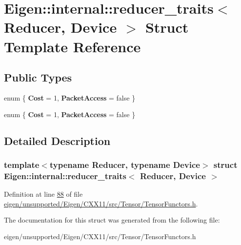 \hypertarget{struct_eigen_1_1internal_1_1reducer__traits}{}\section{Eigen\+:\+:internal\+:\+:reducer\+\_\+traits$<$ Reducer, Device $>$ Struct Template Reference}
\label{struct_eigen_1_1internal_1_1reducer__traits}
\subsection*{Public Types}
\begin{DoxyCompactItemize}
\item 
\mbox{\label{struct_eigen_1_1internal_1_1reducer__traits_a80837a710b5115ffe231293f2caddb61}} 
enum \{ {\bfseries Cost} = 1, 
{\bfseries Packet\+Access} = false
 \}
\item 
\mbox{\label{struct_eigen_1_1internal_1_1reducer__traits_a71e9da3b31dad3f3a0261854a169783f}} 
enum \{ {\bfseries Cost} = 1, 
{\bfseries Packet\+Access} = false
 \}
\end{DoxyCompactItemize}


\subsection{Detailed Description}
\subsubsection*{template$<$typename Reducer, typename Device$>$\newline
struct Eigen\+::internal\+::reducer\+\_\+traits$<$ Reducer, Device $>$}



Definition at line \hyperlink{eigen_2unsupported_2_eigen_2_c_x_x11_2src_2_tensor_2_tensor_functors_8h_source_l00088}{88} of file \hyperlink{eigen_2unsupported_2_eigen_2_c_x_x11_2src_2_tensor_2_tensor_functors_8h_source}{eigen/unsupported/\+Eigen/\+C\+X\+X11/src/\+Tensor/\+Tensor\+Functors.\+h}.



The documentation for this struct was generated from the following file\+:\begin{DoxyCompactItemize}
\item 
eigen/unsupported/\+Eigen/\+C\+X\+X11/src/\+Tensor/\+Tensor\+Functors.\+h\end{DoxyCompactItemize}
